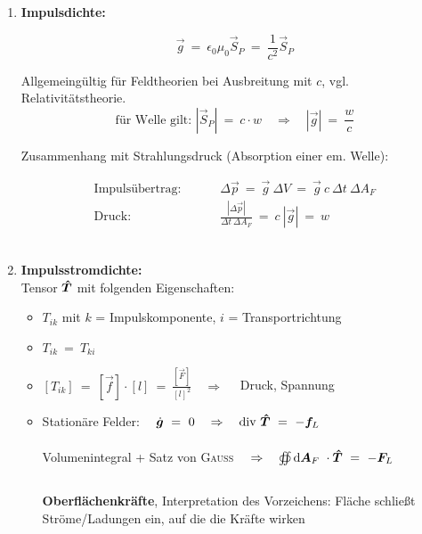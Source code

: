 \begin{enumerate}
\item \textbf{Impulsdichte:}

\begin{equation*}
\vec{g} \ = \ \epsilon_0\mu_0 \vec{S}_P \ = \ \frac{1}{c^2}\vec{S}_P
\end{equation*} 

Allgemeingültig für Feldtheorien bei Ausbreitung mit $c$, vgl. Relativitätstheorie.
\begin{equation*}
\text{für Welle gilt: } |\vec{S}_P| \ = \ c \cdot w \quad \Rightarrow \quad |\vec{g}| \ = \ \frac{w}{c} 
\end{equation*}

Zusammenhang mit Strahlungsdruck (Absorption einer em. Welle): 

\begin{align*}
\text{Impulsübertrag:  } \qquad & \Delta \vec{p} \ = \ \vec{g} \ \Delta V \ = \ \vec{g} \ c \ \Delta t \ \Delta A_F\\
\text{Druck: } \qquad & \frac{|\Delta\vec{p}|}{\Delta t \ \Delta A_F} \ = \ c \ |\vec{g}| \ = \ w
\end{align*}
\ \\
\item \textbf{Impulsstromdichte:} \\

Tensor $\bm{\hat{T}}$ mit folgenden Eigenschaften:

\begin{itemize}
\item $T_{ik}$ mit $k$ = Impulskomponente, $i$ = Transportrichtung
\item $T_{ik} \ = \ T_{ki}$
\item $ [T_{ik}] \ = \ [\vec{f}] \cdot [l] \ = \ \frac{[\vec{F}]}{[l]^2} \quad \Rightarrow \quad$ Druck, Spannung
\item Stationäre Felder: $\quad \dot{\vec{g}} \ = \ 0 \quad \Rightarrow \quad \div \tens{T} \ = \ -\vec{f}_L$\\
\ \\
Volumenintegral + Satz von \textsc{Gauss} $ \quad \Rightarrow \quad \oiint\limits_{{}}^{{}}\mathrm{d}{\bm{A}_F}\  \cdot \bm{\hat{T}} \ = \ - \bm{F}_L \quad$\\
\ \\
\textbf{Oberflächenkräfte}, Interpretation des Vorzeichens: Fläche schließt Ströme/Ladungen ein, auf die die Kräfte wirken
\end{itemize}
\end{enumerate}

